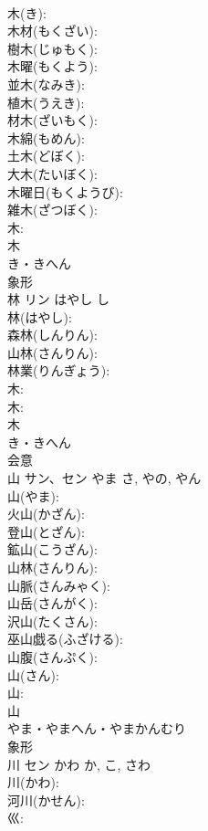 \documentclass[8pt]{extreport}
\begin{document}
\begin{CJK}{UTF8}{min}
\\	木(き): 
\\	木材(もくざい): 
\\	樹木(じゅもく): 
\\	木曜(もくよう): 
\\	並木(なみき): 
\\	植木(うえき): 
\\	材木(ざいもく): 
\\	木綿(もめん): 
\\	土木(どぼく): 
\\	大木(たいぼく): 
\\	木曜日(もくようび): 
\\	雑木(ざつぼく): 
\\	木: 
\\	木	
\\	き・きへん	
\\	象形 
\\	林	リン	はやし	し	
\\	林(はやし): 
\\	森林(しんりん): 
\\	山林(さんりん): 
\\	林業(りんぎょう): 
\\	木: 
\\	木: 
\\	木	
\\	き・きへん	
\\	会意 
\\	山	サン、セン	やま	さ, やの, やん	
\\	山(やま): 
\\	火山(かざん): 
\\	登山(とざん): 
\\	鉱山(こうざん): 
\\	山林(さんりん): 
\\	山脈(さんみゃく): 
\\	山岳(さんがく): 
\\	沢山(たくさん): 
\\	巫山戯る(ふざける): 
\\	山腹(さんぷく): 
\\	山(さん): 
\\	山: 
\\	山	
\\	やま・やまへん・やまかんむり	
\\	象形 
\\	川	セン	かわ	か, こ, さわ	
\\	川(かわ): 
\\	河川(かせん): 
\\	巛: 

\end{CJK}
\end{document}
